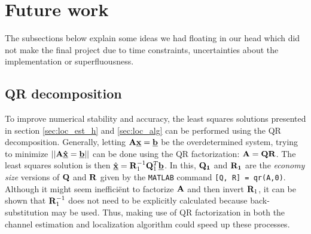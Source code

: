 \documentclass[11pt,titlepage]{report}
\begin{document}
\section{Future work}
\label{sec:loc_future}
The subsections below explain some ideas we had floating in our head which did not make the final project due to time constraints, uncertainties about the implementation or superfluousness. 
\subsection{QR decomposition}
To improve numerical stability and accuracy, the least squares solutions presented in section \ref{sec:loc_est_h} and \ref{sec:loc_alg} can be performed using the QR decomposition. Generally, letting $\mathbf{A}\mathbf{\underline{x}}=\mathbf{\underline{b}}$ be the overdetermined system, trying to minimize $||\mathbf{A}\mathbf{\underline{\hat{x}}}=\mathbf{\underline{b}}||$ can be done using the QR factorization: $\mathbf{A}=\mathbf{Q}\mathbf{R}$. The least squares solution is then $\hat{\mathbf{\underline{x}}}=\mathbf{R}_1^{-1}\mathbf{Q}_1^T\mathbf{\underline{b}}$. In this, $\mathbf{Q_1}$ and $\mathbf{R_1}$ are the \textit{economy size} versions of $\mathbf{Q}$ and $\mathbf{R}$ given by the \texttt{MATLAB} command \texttt{[Q, R] = qr(A,0)}. Although it might seem ineffici\"ent to factorize $\mathbf{A}$ and then invert $\mathbf{R}_1$, it can be shown \cite{num-methods} that $\mathbf{R}_1^{-1}$ does not need to be explicitly calculated because back-substitution may be used. Thus, making use of QR factorization in both the channel estimation and localization algorithm could speed up these processes.
\end{document}
